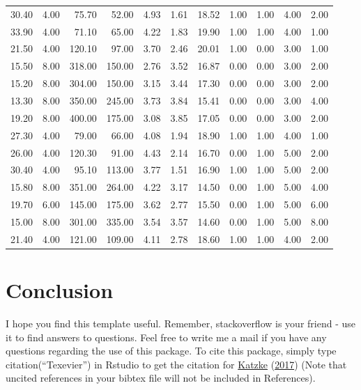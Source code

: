 \documentclass[11pt,preprint, authoryear]{elsarticle}
\numberwithin{equation}{section}
\numberwithin{figure}{section}
\numberwithin{table}{section}
\begin{document}
\begin{longtable}{rrrrrrrrrrr}
  30.40 & 4.00 & 75.70 & 52.00 & 4.93 & 1.61 & 18.52 & 1.00 & 1.00 & 4.00 & 2.00 \\ 
  33.90 & 4.00 & 71.10 & 65.00 & 4.22 & 1.83 & 19.90 & 1.00 & 1.00 & 4.00 & 1.00 \\ 
  21.50 & 4.00 & 120.10 & 97.00 & 3.70 & 2.46 & 20.01 & 1.00 & 0.00 & 3.00 & 1.00 \\ 
  15.50 & 8.00 & 318.00 & 150.00 & 2.76 & 3.52 & 16.87 & 0.00 & 0.00 & 3.00 & 2.00 \\ 
  15.20 & 8.00 & 304.00 & 150.00 & 3.15 & 3.44 & 17.30 & 0.00 & 0.00 & 3.00 & 2.00 \\ 
  13.30 & 8.00 & 350.00 & 245.00 & 3.73 & 3.84 & 15.41 & 0.00 & 0.00 & 3.00 & 4.00 \\ 
  19.20 & 8.00 & 400.00 & 175.00 & 3.08 & 3.85 & 17.05 & 0.00 & 0.00 & 3.00 & 2.00 \\ 
  27.30 & 4.00 & 79.00 & 66.00 & 4.08 & 1.94 & 18.90 & 1.00 & 1.00 & 4.00 & 1.00 \\ 
  26.00 & 4.00 & 120.30 & 91.00 & 4.43 & 2.14 & 16.70 & 0.00 & 1.00 & 5.00 & 2.00 \\ 
  30.40 & 4.00 & 95.10 & 113.00 & 3.77 & 1.51 & 16.90 & 1.00 & 1.00 & 5.00 & 2.00 \\ 
  15.80 & 8.00 & 351.00 & 264.00 & 4.22 & 3.17 & 14.50 & 0.00 & 1.00 & 5.00 & 4.00 \\ 
  19.70 & 6.00 & 145.00 & 175.00 & 3.62 & 2.77 & 15.50 & 0.00 & 1.00 & 5.00 & 6.00 \\ 
  15.00 & 8.00 & 301.00 & 335.00 & 3.54 & 3.57 & 14.60 & 0.00 & 1.00 & 5.00 & 8.00 \\ 
  21.40 & 4.00 & 121.00 & 109.00 & 4.11 & 2.78 & 18.60 & 1.00 & 1.00 & 4.00 & 2.00 \\ 
   \bottomrule
\end{longtable}
\endgroup

\hfill

\hypertarget{conclusion}{%
\section{\texorpdfstring{Conclusion
\label{con}}{Conclusion }}\label{conclusion}}

I hope you find this template useful. Remember, stackoverflow is your
friend - use it to find answers to questions. Feel free to write me a
mail if you have any questions regarding the use of this package. To
cite this package, simply type citation(``Texevier'') in Rstudio to get
the citation for \protect\hyperlink{ref-Texevier}{Katzke}
(\protect\hyperlink{ref-Texevier}{2017}) (Note that uncited references
in your bibtex file will not be included in References).
\end{document}
